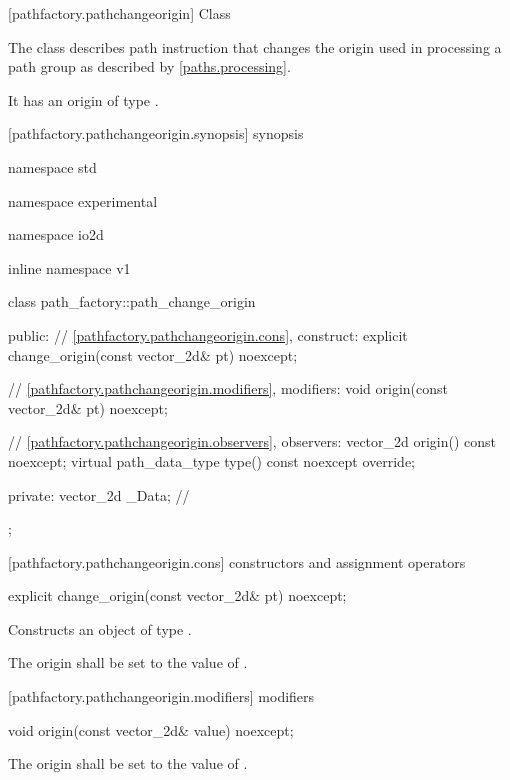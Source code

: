  [pathfactory.pathchangeorigin] {Class }

\pnum
{}
The class  describes path instruction that changes the origin used in processing a path group as described by \ref{paths.processing}.

\pnum
It has an origin of type .

 [pathfactory.pathchangeorigin.synopsis] { synopsis}

\begin{codeblock}
namespace std { namespace experimental { namespace io2d { inline namespace v1 {
  class path_factory::path_change_origin {
  public:
    // \ref{pathfactory.pathchangeorigin.cons}, construct:
    explicit change_origin(const vector_2d& pt) noexcept;

    // \ref{pathfactory.pathchangeorigin.modifiers}, modifiers:
    void origin(const vector_2d& pt) noexcept;

    // \ref{pathfactory.pathchangeorigin.observers}, observers:
    vector_2d origin() const noexcept;
    virtual path_data_type type() const noexcept override;
    
  private:
    vector_2d _Data; // \expos
  };
} } } }
\end{codeblock}

 [pathfactory.pathchangeorigin.cons] { constructors and assignment operators}

\begin{itemdecl}
    explicit change_origin(const vector_2d& pt) noexcept;
\end{itemdecl}
\begin{itemdescr}
	\pnum
	\effects
	Constructs an object of type .
	
	\pnum
	The origin shall be set to the value of .
\end{itemdescr}

 [pathfactory.pathchangeorigin.modifiers]{ modifiers}

\begin{itemdecl}
    void origin(const vector_2d& value) noexcept;
\end{itemdecl}
\begin{itemdescr}
	\pnum
	\effects
	The origin shall be set to the value of .
\end{itemdescr}

